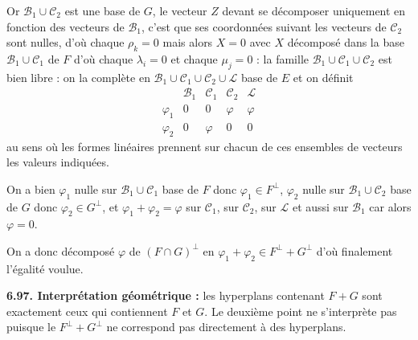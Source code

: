 Or $\mathcal B_1\cup\mathcal C_2$ est une base de $G$, le vecteur $Z$ devant se décomposer uniquement en fonction des vecteurs de $\mathcal B_1$, c'est que ses coordonnées suivant les vecteurs de $\mathcal C_2$ sont nulles, d'où chaque $\rho_k=0$ mais alors $X=0$ avec $X$ décomposé dans la base $\mathcal B_1\cup\mathcal C_1$ de $F$ d'où chaque $\lambda_i=0$ et chaque $\mu_j=0$ : la famille $\mathcal B_1\cup\mathcal C_1\cup\mathcal C_2$ est bien libre : on la complète en $\mathcal B_1\cup\mathcal C_1\cup\mathcal C_2\cup\mathcal L$ base de $E$ et on définit
\[
\begin{array}{c|cccc}
&\mathcal B_1&\mathcal C_1&\mathcal C_2&\mathcal L\\\hline
\varphi_1&0&0&\varphi&\varphi\\
\varphi_2&0&\varphi&0&0
\end{array}
\]
au sens où les formes linéaires prennent sur chacun de ces ensembles de vecteurs les valeurs indiquées.

On a bien $\varphi_1$ nulle sur $\mathcal B_1\cup\mathcal C_1$ base de $F$ donc $\varphi_1\in F^\perp$, $\varphi_2$ nulle sur $\mathcal B_1\cup\mathcal C_2$ base de $G$ donc $\varphi_2\in G^\perp$, et $\varphi_1+\varphi_2=\varphi$ sur $\mathcal C_1$, sur $\mathcal C_2$, sur $\mathcal L$ et aussi sur $\mathcal B_1$ car alors $\varphi=0$.

On a donc décomposé $\varphi$ de $(F\cap G)^\perp$ en $\varphi_1+\varphi_2\in F^\perp+G^\perp$ d'où finalement l'égalité voulue. \bookend

\medskip\noindent\textbf{6.97. Interprétation géométrique :} les hyperplans contenant $F+G$ sont exactement ceux qui contiennent $F$ et $G$. Le deuxième point ne s'interprète pas puisque le $F^\perp+G^\perp$ ne correspond pas directement à des hyperplans.

